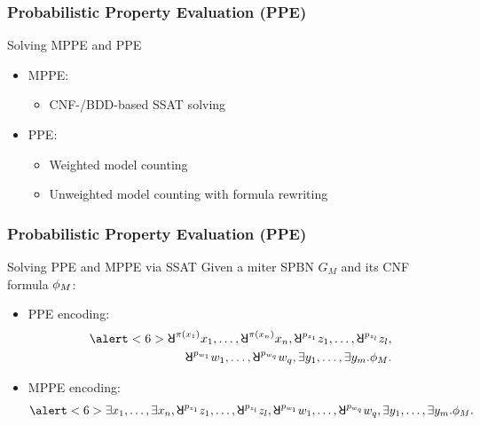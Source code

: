 \begin{frame}
  \frametitle{Probabilistic Property Evaluation (PPE)}
  \begin{block}{Solving MPPE and PPE}
    \begin{itemize}
      \item MPPE:
            \pause
            \begin{itemize}
              \item CNF-/BDD-based SSAT solving
                    \pause
            \end{itemize}
      \item PPE:
            \pause
            \begin{itemize}
              \item Weighted model counting
                    \pause
              \item Unweighted model counting with formula rewriting
            \end{itemize}
    \end{itemize}
  \end{block}
\end{frame}

\begin{frame}
  \frametitle{Probabilistic Property Evaluation (PPE)}
  \begin{block}{Solving PPE and MPPE via SSAT}
    Given a miter SPBN $G_M$ and its CNF formula $\phi_M$:
    \pause
    \begin{itemize}
      \item PPE encoding:
            \pause
            \belowdisplayskip=0pt
            \begin{align*}
              \alert<6>{\random{\pi(x_1)}x_1,\ldots,\random{\pi(x_n)}x_n},
              \random{p_{z_1}}z_1,\ldots,\random{p_{z_l}}z_l, \\
              \random{p_{w_1}}w_1,\ldots,\random{p_{w_q}}w_q,
              \exists y_1,\ldots,\exists y_m.
              \pf_M.
            \end{align*}
            \pause
      \item MPPE encoding:
            \pause
            \begin{align*}
              \alert<6>{\exists x_1,\ldots,\exists x_n},
              \random{p_{z_1}}z_1,\ldots,\random{p_{z_l}}z_l,
              \random{p_{w_1}}w_1,\ldots,\random{p_{w_q}}w_q,
              \exists y_1,\ldots,\exists y_m.
              \pf_M.
            \end{align*}
    \end{itemize}
  \end{block}
\end{frame}

